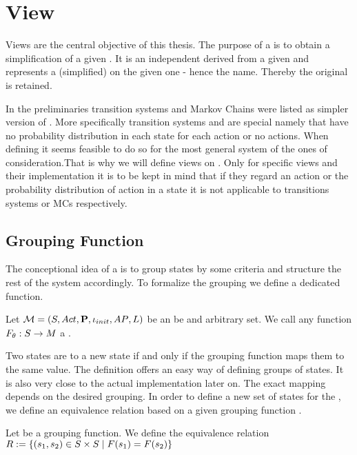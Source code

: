 \documentclass[preview]{standalone}
\begin{document}
\section{View}
Views are the central objective of this thesis. The purpose of a \viewN is to obtain a simplification of a given \chosengraphtypeN.  It is an independent \chosengraphtypeN derived from a given \chosengraphtypeN and represents a (simplified) \viewN on the given one - hence the name. Thereby the original \chosengraphtypeN is retained.

In the preliminaries transition systems and Markov Chains were listed as simpler version of \mdpsN. More specifically transition systems and \mdpsN are special \mdpsN namely that have no probability distribution in each state for each action or no actions. When defining \viewsN it seems feasible to do so for the most general system of the ones of consideration.That is why we will define views on \mdpsN. Only for specific views and their implementation it is to be kept in mind that if they regard an action or the probability distribution of action in a state it is not applicable to transitions systems or MCs respectively. 

\subsection{Grouping Function}
The conceptional idea of a \viewN is to group states by some criteria and structure the rest of the system accordingly. To formalize the grouping we define a dedicated function.

\begin{definition}
	Let ${{{\mathcal{M}}}} = {{({S}, {Act}, {\textbf{P}}, {\iota_{init}}, {AP}, {L})}}$ be \chosengraphtypeN an \arbset be and arbitrary set. We call any function ${F}_\theta : {S} \to {\ensuremath{{M}}}$ a \emph{\grpfctN}. \
	
	\label{def:grpfct}
\end{definition}


Two states are  to a new state if and only if the grouping function maps them to the same value. The definition offers an easy way of defining groups of states. It is also very close to the actual implementation later on. The exact mapping depends on the desired grouping. In order to define a new set of states for the \viewN, we define an equivalence relation \eqrelview based on a given grouping function \grpfct.

\begin{definition}
	Let \grpfct be a grouping function. We define the equivalence relation ${R} :=\{ ({s}_1, {s}_2) \in {S} \times {S} \mid {F}({s}_1) = {F}({s}_2)\}$
	
	\label{def:eqrelview}
\end{definition}
\end{document}
